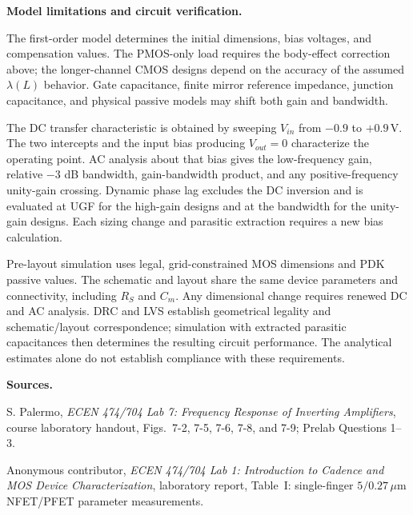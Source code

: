 \documentclass[12pt,letterpaper]{article}
\newcommand{\um}{\,\mu\mathrm{m}}
\newcommand{\V}{\,\mathrm{V}}
\begin{document}
\newpage
\textbf{Model limitations and circuit verification.}

The first-order model determines the initial dimensions, bias voltages,
and compensation values.
The PMOS-only load requires the body-effect correction above;
the longer-channel CMOS designs depend on the accuracy of the
assumed $\lambda(L)$ behavior. Gate capacitance, finite mirror
reference impedance, junction capacitance, and physical passive
models may shift both gain and bandwidth.

\vspace{8pt}
The DC transfer characteristic is obtained by sweeping $V_{in}$
from $-0.9$ to $+0.9\V$. The two intercepts and the input bias
producing $V_{out}=0$ characterize the operating point. AC analysis
about that bias gives the low-frequency gain, relative $-3$ dB
bandwidth, gain-bandwidth product, and any positive-frequency
unity-gain crossing. Dynamic phase lag excludes the DC inversion
and is evaluated at UGF for the high-gain designs and at the bandwidth
for the unity-gain designs. Each sizing change and parasitic extraction
requires a new bias calculation.

\vspace{8pt}
Pre-layout simulation uses legal, grid-constrained MOS dimensions
and PDK passive values. The schematic and layout share the same
device parameters and connectivity, including $R_S$ and $C_m$.
Any dimensional change requires renewed DC and AC analysis.
DRC and LVS establish geometrical legality and schematic/layout
correspondence; simulation with extracted parasitic capacitances
then determines the resulting circuit performance. The analytical
estimates alone do not establish compliance with these requirements.

\vspace{12pt}
\textbf{Sources.}
\begin{enumerate}[label={[\arabic*]},leftmargin=0.3in,
topsep=4pt,itemsep=5pt,parsep=0pt]
\item S. Palermo, \emph{ECEN 474/704 Lab 7: Frequency Response
of Inverting Amplifiers}, course laboratory handout,
Figs.~7-2, 7-5, 7-6, 7-8, and 7-9; Prelab Questions 1--3.
\item Anonymous contributor, \emph{ECEN 474/704 Lab 1: Introduction to Cadence
and MOS Device Characterization}, laboratory report, Table~I:
single-finger $5/0.27\um$ NFET/PFET parameter measurements.
\end{enumerate}
\end{document}
